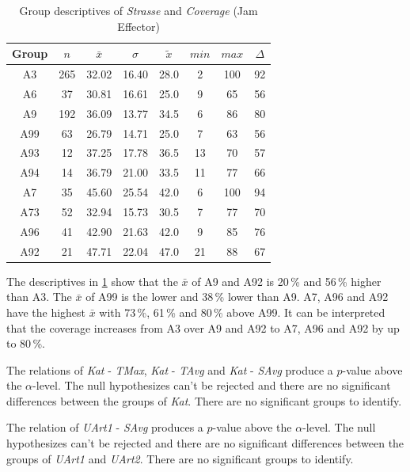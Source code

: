 \begin{table}[ht]
	\tiny
	\centering
	\begin{tabular}{c|c|c|c|c|c|c|c}
		\toprule
		Group & $n$ & $\bar{x}$ & $\sigma$ & $\tilde{x}$ & $min$ & $max$ & $\Delta$ \\
		\midrule
		A3   & 265 & 32.02 & 16.40 & 28.0 & 2  & 100 & 92 \\ 
		A6   & 37  & 30.81 & 16.61 & 25.0 & 9  & 65  & 56 \\ 
		A9   & 192 & 36.09 & 13.77 & 34.5 & 6  & 86  & 80 \\ 
		A99  & 63  & 26.79 & 14.71 & 25.0 & 7  & 63  & 56 \\ 
		A93  & 12  & 37.25 & 17.78 & 36.5 & 13 & 70  & 57 \\ 
		A94  & 14  & 36.79 & 21.00 & 33.5 & 11 & 77  & 66 \\ 
		A7   & 35  & 45.60 & 25.54 & 42.0 & 6  & 100 & 94 \\ 
		A73  & 52  & 32.94 & 15.73 & 30.5 & 7  & 77  & 70 \\ 
		A96  & 41  & 42.90 & 21.63 & 42.0 & 9  & 85  & 76 \\ 
		A92  & 21  & 47.71 & 22.04 & 47.0 & 21 & 88  & 67 \\ 
		\bottomrule
	  \end{tabular}
    \caption{Group descriptives of \textit{Strasse} and \textit{Coverage} (Jam Effector)}
    \label{tbl:descriptives_baysis_effector_Strasse_Cov}
\end{table}
The descriptives in \cref{tbl:descriptives_baysis_effector_Strasse_Cov} show that the $\bar{x}$ of A9 and A92 is 20\,\% and 56\,\% higher than A3. The $\bar{x}$ of A99 is the lower and 38\,\% lower than A9. A7, A96 and A92 have the highest $\bar{x}$ with 73\,\%, 61\,\% and 80\,\% above A99. It can be interpreted that the coverage increases from A3 over A9 and A92 to A7, A96 and A92 by up to 80\,\%.

\clearpage

The relations of \textit{Kat} - \textit{TMax}, \textit{Kat} - \textit{TAvg} and \textit{Kat} - \textit{SAvg} produce a $p$-value above the $\alpha$-level. The null hypothesizes can't be rejected and there are no significant differences between the groups of \textit{Kat}. There are no significant groups to identify.

The relation of \textit{UArt1} - \textit{SAvg} produces a $p$-value above the $\alpha$-level. The null hypothesizes can't be rejected and there are no significant differences between the groups of \textit{UArt1} and \textit{UArt2}. There are no significant groups to identify.

